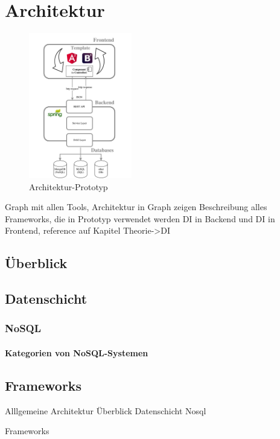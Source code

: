 \chapter{Architektur}
\begin{figure}
\includegraphics[trim = 20mm 0mm 30mm 9mm, clip, width=0.4\textwidth]{resources/architectureMyApp}
\caption[Architektur-Prototyp]{\label{img:myArchitecture}Architektur-Prototyp}
\end{figure}

Graph mit allen Tools, Architektur in Graph zeigen
Beschreibung alles Frameworks, die in Prototyp verwendet werden
DI in Backend und DI in Frontend, reference auf Kapitel Theorie->DI

\section{Überblick}

\section{Datenschicht}

\subsection{NoSQL}
\subsubsection{Kategorien von NoSQL-Systemen}

\section{Frameworks}





Alllgemeine Architektur
    Überblick
    Datenschicht
        Nosql

Frameworks